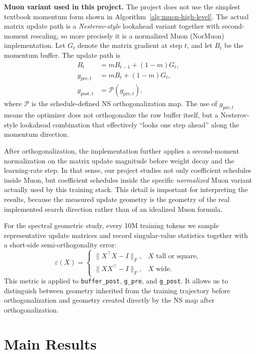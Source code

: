 \documentclass[10pt]{article}
\begin{document}
\textbf{Muon variant used in this project.}
The project does not use the simplest textbook momentum form shown in Algorithm~\ref{alg:muon-high-level}. The actual matrix update path is a \emph{Nesterov-style} lookahead variant together with second-moment rescaling, so more precisely it is a normalized Muon (NorMuon) implementation. Let $G_t$ denote the matrix gradient at step $t$, and let $B_t$ be the momentum buffer. The update path is
\begin{align}
    B_t &= m B_{t-1} + (1-m) G_t, \\
    g_{\mathrm{pre},t} &= m B_t + (1-m) G_t, \\
    g_{\mathrm{post},t} &= \mathcal{P}(g_{\mathrm{pre},t}),
\end{align}
where $\mathcal{P}$ is the schedule-defined NS orthogonalization map. The use of $g_{\mathrm{pre},t}$ means the optimizer does not orthogonalize the raw buffer itself, but a Nesterov-style lookahead combination that effectively ``looks one step ahead'' along the momentum direction.

After orthogonalization, the implementation further applies a second-moment normalization on the matrix update magnitude before weight decay and the learning-rate step. In that sense, our project studies not only coefficient schedules inside Muon, but coefficient schedules inside the specific \emph{normalized} Muon variant actually used by this training stack. This detail is important for interpreting the results, because the measured update geometry is the geometry of the real implemented search direction rather than of an idealized Muon formula.

For the spectral geometric study, every 10M training tokens we sample representative update matrices and record singular-value statistics together with a short-side semi-orthogonality error:
\begin{equation}
    \varepsilon(X)=
    \begin{cases}
        \lVert X^\top X-I\rVert_F, & X \text{ tall or square},\\
        \lVert X X^\top-I\rVert_F, & X \text{ wide}.
    \end{cases}
\end{equation}
This metric is applied to \texttt{buffer\_post}, \texttt{g\_pre}, and \texttt{g\_post}. It allows us to distinguish between geometry inherited from the training trajectory before orthogonalization and geometry created directly by the NS map after orthogonalization.

\section{Main Results}
\end{document}
